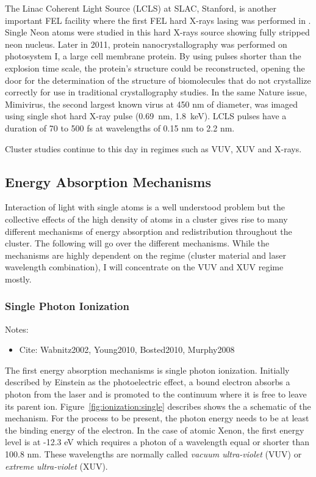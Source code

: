 The Linac Coherent Light Source (LCLS) at SLAC, Stanford, is another important
FEL facility where the first FEL hard X-rays lasing was performed in
\cite{Emma2010,Schneider2010}. Single Neon atoms were studied in
this hard X-rays source\cite{Young2010} showing fully stripped neon nucleus.
Later in 2011, protein nanocrystallography was performed \cite{Chapman2011}
on photosystem I, a large cell membrane protein. By using pulses shorter
than the explosion time scale, the protein's structure could be reconstructed,
opening the door for the determination of the structure of biomolecules that
do not crystallize correctly for use in traditional crystallography studies.
In the same Nature issue, Mimivirus, the second largest known virus at 450 nm
of diameter, was imaged using single shot hard X-ray pulse (0.69~nm,
1.8~keV)\cite{Seibert2011}. LCLS pulses have a duration of 70 to 500 fs at
wavelengths of 0.15 nm to 2.2 nm\cite{Pellegrini2011}.

Cluster studies continue to this day in regimes such as VUV\cite{Arbeiter2011},
XUV\cite{Murphy2008a,Murphy2008b,Krikunova2012} and X-rays\cite{Ziaja2009b}.




\subsection{Energy Absorption Mechanisms}
\label{section:intro:clusters:heating}
Interaction of light with single atoms is a well understood problem but the
collective effects of the high density of atoms in a cluster gives rise to many
different mechanisms of energy absorption and redistribution throughout the
cluster. The following will go over the different mechanisms. While the
mechanisms are highly dependent on the regime (cluster material and
laser wavelength combination), I will concentrate on the VUV and XUV
regime mostly.


\subsubsection{Single Photon Ionization}
Notes:
\begin{itemize}
\item Cite: Wabnitz2002, Young2010, Bosted2010, Murphy2008
\end{itemize}

The first energy absorption mechanisms is single photon ionization. Initially
described by Einstein as the photoelectric effect, a bound electron
absorbs a photon from the laser and is promoted to the continuum where it is
free to leave its parent ion. Figure~\ref{fig:ionization:single} describes
shows the a schematic of the mechanism. For the process to be present, the
photon energy
needs to be at least the binding energy of the electron. In the case of
atomic Xenon, the first energy level is at -12.3 eV which requires a photon
of a wavelength equal or shorter than 100.8 nm. These wavelengths are normally
called \textit{vacuum ultra-violet} (VUV) or \textit{extreme
ultra-violet} (XUV).


